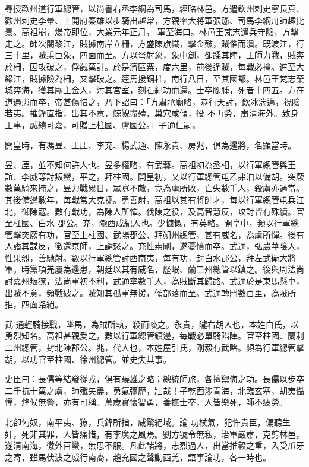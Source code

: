 \begin{pinyinscope}
 尋授歡州道行軍總管，以尚書右丞李綱為司馬，經略林邑。方遣欽州刺史寧長真、歡州刺史李暈、上開府秦雄以步騎出越常，方親率大將軍張愻、司馬李綱舟師趣比景。高祖崩，煬帝即位，大業元年正月，
 軍至海口。林邑王梵志遣兵守險，方擊走之。師次闍黎江，賊據南岸立柵，方盛陳旗幟，擊金鼓，賊懼而潰。既渡江，行三十里，賊乘巨象，四面而至。方以弩射象，象中創，卻蹂其陣，王師力戰，賊奔於柵，因攻破之，俘馘萬計。於是濟區粟，度六里，前後逢賊，每戰必擒。進至大緣江，賊據險為柵，又擊破之。逕馬援銅柱，南行八日，至其國都。林邑王梵志棄城奔海，獲其廟主金人，污其宮室，刻石紀功而還。士卒腳腫，死者十四五。方在道遇患而卒，帝甚傷惜之，乃下詔曰：「方肅承廟略，恭行天討，飲冰湍邁，視險若夷。摧鋒直指，出其不意，鯨鯢盡殪，巢穴咸傾，役
 不再勞，肅清海外。致身王事，誠績可嘉，可贈上柱國、盧國公。」子通仁嗣。



 開皇時，有馮昱、王厓、李充、楊武通、陳永貴、房兆，俱為邊將，名顯當時。



 昱、厓，並不知何許人也。昱多權略，有武藝。高祖初為丞相，以行軍總管與王誼、李威等討叛蠻，平之，拜柱國。開皇初，又以行軍總管屯乙弗泊以備胡。突厥數萬騎來掩之，昱力戰累日，眾寡不敵，竟為虜所敗，亡失數千人，殺虜亦過當。其後備邊數年，每戰常大克捷。勇善射，高祖以其有將帥才，每以行軍總管屯兵江北，御陳寇。數有戰功，為陳人所憚。伐陳之役，及高智慧反，攻討皆有殊績。官至柱國、白水
 郡公。充，隴西成紀人也。少慷慨，有英略。開皇中，頻以行軍總管擊突厥有功，官至上柱國、武陽郡公、拜朔州總管，甚有威名，為虜所憚。後有人譖其謀反，徵還京師，上譴怒之。充性素剛，遂憂憤而卒。武通，弘農華陰人，性果烈，善馳射。數以行軍總管討西南夷，每有功，封白水郡公，拜左武衛大將軍。時黨項羌屢為邊患，朝廷以其有威名，歷岷、蘭二州總管以鎮之。後與周法尚討嘉州叛獠，法尚軍初不利，武通率數千人，為賊斷其歸路。武通於是束馬懸車，出賊不意，頻戰破之。賊知其孤軍無援，傾部落而至。武通轉鬥數百里，為賊所拒，四面路絕。



 武
 通輕騎接戰，墜馬，為賊所執，殺而啖之。永貴，隴右胡人也，本姓白氏，以勇烈知名。高祖甚親愛之，數以行軍總管鎮邊，每戰必單騎陷陣。官至柱國、蘭利二州總管，封北陳郡公。兆，代人也，本姓屋引氏，剛毅有武略。頻為行軍總管擊胡，以功官至柱國、徐州總管。並史失其事。



 史臣曰：長儒等結發從戎，俱有驍雄之略；總統師旅，各擅禦侮之功。長儒以步卒二千抗十萬之虜，師殲矢盡，勇氣彌歷，壯哉！子乾西涉青海，北臨玄塞，胡夷懾憚，烽候無警，亦有可稱。萬歲實懷智勇，善撫士卒，人皆樂死，師不疲勞。



 北卻匈奴，南平夷、獠，兵鋒所指，威驚絕域。論
 功杖氣，犯忤貴臣，偏聽生奸，死非其罪，人皆痛惜，有李廣之風焉。劉方號令無私，治軍嚴肅，克剪林邑，遂清南海，徼外百蠻，無思不服。凡此諸將，志烈過人，出當推轂之重，入受爪牙之寄，雖馬伏波之威行南裔，趙充國之聲動西羌，語事論功，各一時也。



\end{pinyinscope}